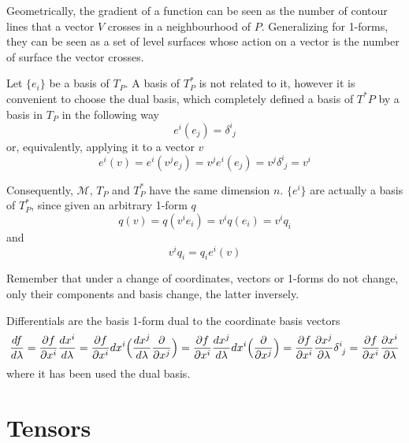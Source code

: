     Geometrically, the gradient of a function can be seen as the number of contour lines that a vector $V$ crosses in a neighbourhood of $P$. Generalizing for 1-forms, they can be seen as a set of level surfaces whose action on a vector is the number of surface the vector crosses. 

    Let $\{e_i\}$ be a basis of $T_P$. A basis of $T^*_P$ is not related to it, however it is convenient to choose the dual basis, which completely defined a basis of $T^*P$ by a basis in $T_P$ in the following way
    \begin{equation*}
        e^i(e_j) = \delta^i_{\phantom i j}
    \end{equation*}
    or, equivalently, applying it to a vector $v$
    \begin{equation*}
        e^i(v) = e^i(v^j e_j) = v^j e^i(e_j) = v^j \delta^i_{\phantom i j} = v^i
    \end{equation*}

    Consequently, $\mathcal M$, $T_P$ and $T^*_P$ have the same dimension $n$. $\{e^i\}$ are actually a basis of $T^*_P$, since given an arbitrary 1-form $q$
    \begin{equation*}
        q(v) = q(v^i e_i) = v^i q(e_i) = v^i q_i
    \end{equation*}
    and
    \begin{equation*}
        v^i q_i = q_i e^i(v)
    \end{equation*}

    Remember that under a change of coordinates, vectors or 1-forms do not change, only their components and basis change, the latter inversely.

    Differentials are the basis 1-form dual to the coordinate basis vectors 
    \begin{equation*}
        \dv{f}{\lambda} = \pdv{f}{x^i} \dv{x^i}{\lambda} = \pdv{f}{x^i} dx^i \Big(\dv{x^j}{\lambda} \pdv{}{x^j} \Big) = \pdv{f}{x^i} \dv{x^j}{\lambda} dx^i \Big ( \pdv{}{x^j} \Big) = \pdv{f}{x^i} \pdv{x^j}{\lambda} \delta^i_{\phantom i j} = \pdv{f}{x^i} \pdv{x^i}{\lambda}
    \end{equation*}
    where it has been used the dual basis.

\section{Tensors}
